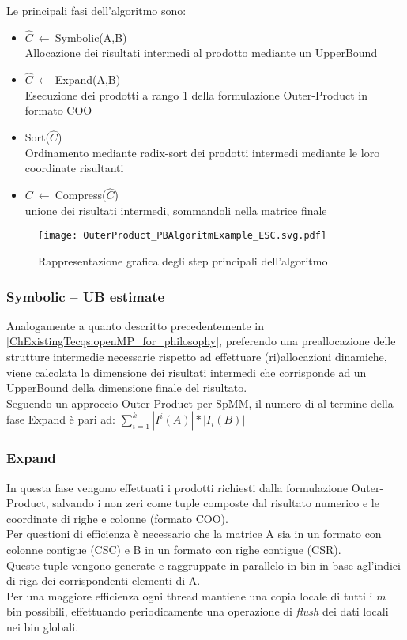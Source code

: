 Le principali fasi dell'algoritmo sono:
\begin{itemize}
	\item $\hat{C}~\leftarrow~$Symbolic(A,B) \\ Allocazione dei risultati intermedi al prodotto mediante un UpperBound
	\item $\hat{C}~\leftarrow~$Expand(A,B)	 \\ Esecuzione dei prodotti a rango 1 della formulazione Outer-Product in formato COO
	\item Sort($\hat{C}$) 					 \\ Ordinamento mediante radix-sort dei prodotti intermedi mediante le loro coordinate risultanti
	\item $C~\leftarrow~$Compress($\hat{C}$) \\ unione dei risultati intermedi, sommandoli nella matrice finale
\end{itemize}

\begin{figure}[H]
  \centering \texttt{[image: OuterProduct\_PBAlgoritmExample\_ESC.svg.pdf]}
  \caption[passi principali dell'algoritmo ESC-PropagationBlocking]{Rappresentazione grafica degli step principali dell'algoritmo}
  \decoRule \label{fig:OuterProduct_PBAlgoritmExample_ESC}
\end{figure}

\subsubsection{Symbolic -- UB estimate}
Analogamente a quanto descritto precedentemente in \ref{ChExistingTecqs:openMP_for_philosophy}, 
preferendo una preallocazione delle strutture intermedie necessarie rispetto ad effettuare (ri)allocazioni dinamiche, 
viene calcolata la dimensione dei risultati intermedi che corrisponde ad un UpperBound della dimensione finale del risultato.\\
Seguendo un approccio Outer-Product per SpMM, il numero di \nnz al termine della fase Expand è pari ad:	$ \sum\limits_{i = 1}^k  | I^i(A) | *| I_i(B) | $ \\ %
 
\subsubsection{Expand}
In questa fase vengono effettuati i prodotti richiesti dalla formulazione Outer-Product, 
salvando i non zeri come tuple composte dal risultato numerico e le coordinate di righe e colonne (formato COO).\\
Per questioni di efficienza è necessario che la matrice A sia in un formato con colonne contigue (CSC) 
e B in un formato con righe contigue (CSR).\\
Queste tuple vengono generate e raggruppate in parallelo in bin in base agl'indici di riga dei corrispondenti elementi di A.\\
Per una maggiore efficienza ogni thread mantiene una copia locale di tutti i $m$ bin possibili, 
effettuando periodicamente una operazione di \emph{flush} dei dati locali nei bin globali.\\ 

